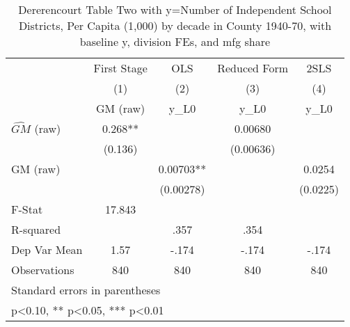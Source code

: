 \begin{table}[htbp]\centering
\def\sym#1{\ifmmode^{#1}\else\(^{#1}\)\fi}
\caption{Dererencourt Table Two with y=Number of Independent School Districts, Per Capita (1,000) by decade in County 1940-70, with baseline y, division FEs, and mfg share}
\begin{tabular}{l*{4}{c}}
\toprule
                    & First Stage   &         OLS   &Reduced Form   &        2SLS   \\
                    &\multicolumn{1}{c}{(1)}&\multicolumn{1}{c}{(2)}&\multicolumn{1}{c}{(3)}&\multicolumn{1}{c}{(4)}\\
                    &\multicolumn{1}{c}{GM  (raw)}&\multicolumn{1}{c}{y\_L0}&\multicolumn{1}{c}{y\_L0}&\multicolumn{1}{c}{y\_L0}\\
\midrule
$\hat{GM}$ (raw)    &       0.268** &               &     0.00680   &               \\
                    &     (0.136)   &               &   (0.00636)   &               \\
\addlinespace
GM  (raw)           &               &     0.00703** &               &      0.0254   \\
                    &               &   (0.00278)   &               &    (0.0225)   \\
\midrule
F-Stat              &      17.843   &               &               &               \\
R-squared           &               &        .357   &        .354   &               \\
Dep Var Mean        &        1.57   &       -.174   &       -.174   &       -.174   \\
Observations        &         840   &         840   &         840   &         840   \\
\bottomrule
\multicolumn{5}{l}{\footnotesize Standard errors in parentheses}\\
\multicolumn{5}{l}{\footnotesize * p<0.10, ** p<0.05, *** p<0.01}\\
\end{tabular}
\end{table}
